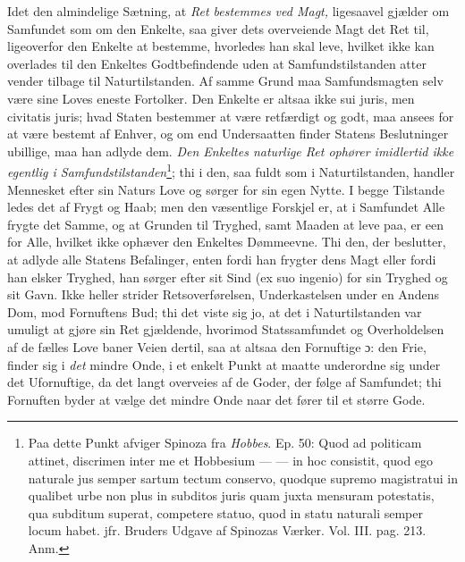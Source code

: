 \documentclass[12pt,a4paper]{book}
\newcommand{\opage}[1]{\marginnote{\footnotesize\textit{[#1]}}}
\begin{document}
\opage{139} %
\setcounter{footnote}{0}%
Idet den almindelige Sætning, at \emph{Ret bestemmes ved Magt,} ligesaavel gjælder om Samfundet som om den Enkelte, saa giver dets overveiende Magt det Ret til, ligeoverfor den Enkelte at bestemme, hvorledes han skal leve, hvilket ikke kan overlades til den Enkeltes Godtbefindende uden at Samfundstilstanden atter vender tilbage til Naturtilstanden. Af samme Grund maa Samfundsmagten selv være sine Loves eneste Fortolker. Den Enkelte er altsaa ikke sui juris, men civitatis juris; hvad Staten bestemmer at være retfærdigt og godt, maa ansees for at være bestemt af Enhver, og om end Undersaatten finder Statens Beslutninger ubillige, maa han adlyde dem. \emph{Den Enkeltes naturlige Ret ophører imidlertid ikke egentlig i Samfundstilstanden}\footnote{Paa dette Punkt afviger Spinoza fra \emph{Hobbes}. Ep. 50: Quod ad politicam attinet, discrimen inter me et Hobbesium --- --- in hoc consistit, quod ego naturale jus semper sartum tectum conservo, quodque supremo magistratui in qualibet urbe non plus in subditos juris quam juxta mensuram potestatis, qua subditum superat, competere statuo, quod in statu naturali semper locum habet. jfr. Bruders Udgave af Spinozas Værker. Vol. III. pag. 213. Anm.}; thi i den, saa fuldt som i Naturtilstanden, handler Mennesket efter sin Naturs Love og sørger for sin egen Nytte. I begge Tilstande ledes det af Frygt og Haab; men den væsentlige Forskjel er, at i Samfundet Alle frygte det Samme, og at Grunden til Tryghed, samt Maaden at leve paa, er een for Alle, hvilket ikke ophæver den Enkeltes Dømmeevne. Thi den, der beslutter, at adlyde alle Statens Befalinger, enten fordi han frygter dens Magt eller fordi han elsker Tryghed, han sørger efter sit Sind (ex suo ingenio) for sin Tryghed og sit Gavn. Ikke heller strider Retsoverførelsen, Underkastelsen under en Andens Dom, mod Fornuftens Bud; thi det viste sig jo, at det i Naturtilstanden var umuligt at gjøre sin Ret gjældende, hvorimod Statssamfundet og Overholdelsen af de fælles Love baner Veien dertil, saa at altsaa den Fornuftige ɔ: den Frie, finder sig i \emph{det} mindre Onde, i et enkelt Punkt
\opage{140} \setcounter{footnote}{0}%
at maatte underordne sig under det Ufornuftige, da det langt overveies af de Goder, der følge af Samfundet; thi Fornuften byder at vælge det mindre Onde naar det fører til et større Gode.
\end{document}
